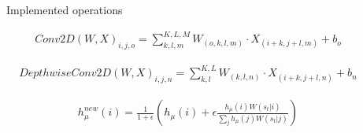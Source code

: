 \documentclass[final]{beamer}
\newlength{\sepwid}
\newlength{\onecolwid}
\newlength{\twocolwid}
\begin{document}
\begin{frame}[t]
\begin{columns}[t]
\begin{column}{\twocolwid}
\begin{alertblock}{Implemented operations}
	
\begin{eqnarray} \label{eq:conv2D}
Conv2D\left(W,X\right)_{i,j,o}=\sum_{k,l,m}^{K,L,M}W_{(o,k,l,m)} \cdot X_{(i+k,j+l,m)}+b_{o}
\end{eqnarray}


\begin{eqnarray} \label{eq:dconv2D}
DepthwiseConv2D\left(W,X\right)_{i,j,n}=\sum_{k,l}^{K,L}W_{(k,l,n)} \cdot X_{(i+k,j+l,n)}+b_{n}
\end{eqnarray}

\begin{eqnarray} \label{eq:sbs_update}
h_\mu^{new}(i) = \frac{1}{1+\epsilon} \left(h_\mu(i) + \epsilon \frac{h_\mu(i) W(s_t|i) }{\sum_j h_\mu(j) W(s_t|j)} \right) 
\end{eqnarray}

\end{alertblock} 


\begin{columns}[t,totalwidth=\twocolwid] %

\begin{column}{\onecolwid} %




\end{column} %

\begin{column}{\onecolwid} %

\end{column} %

\end{columns} %

\end{column} %

\begin{column}{\sepwid}\end{column} %


\end{columns}
\end{frame}
\end{document}
